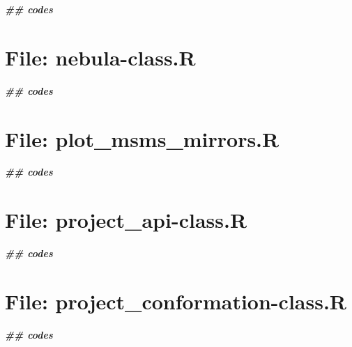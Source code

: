 \documentclass[
]{article}
\newenvironment{Shaded}{\begin{snugshade}}{\end{snugshade}}
\newcommand{\DocumentationTok}[1]{\textcolor[rgb]{0.56,0.35,0.01}{\textbf{\textit{#1}}}}
\begin{document}
\begin{Shaded}
\begin{Highlighting}[]
\DocumentationTok{\#\# codes}
\end{Highlighting}
\end{Shaded}

\hypertarget{file-nebula-class.r}{%
\section{File: nebula-class.R}\label{file-nebula-class.r}}

\begin{Shaded}
\begin{Highlighting}[]
\DocumentationTok{\#\# codes}
\end{Highlighting}
\end{Shaded}

\hypertarget{file-plot_msms_mirrors.r}{%
\section{File: plot\_msms\_mirrors.R}\label{file-plot_msms_mirrors.r}}

\begin{Shaded}
\begin{Highlighting}[]
\DocumentationTok{\#\# codes}
\end{Highlighting}
\end{Shaded}

\hypertarget{file-project_api-class.r}{%
\section{File: project\_api-class.R}\label{file-project_api-class.r}}

\begin{Shaded}
\begin{Highlighting}[]
\DocumentationTok{\#\# codes}
\end{Highlighting}
\end{Shaded}

\hypertarget{file-project_conformation-class.r}{%
\section{File: project\_conformation-class.R}\label{file-project_conformation-class.r}}

\begin{Shaded}
\begin{Highlighting}[]
\DocumentationTok{\#\# codes}
\end{Highlighting}
\end{Shaded}
\end{document}
